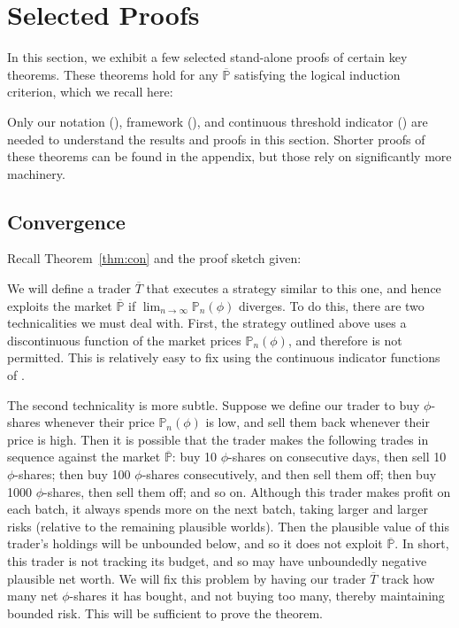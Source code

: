 \documentclass[authordate,onecolumn,noenvironments]{miri-tech-article}
\numberwithin{equation}{subsection}
\newcommand{\seq}[1]{{\overline{#1}}}
\newcommand{\nn}{n}
\newcommand{\lic}{logical induction criterion}
\newcommand{\trade}{T}%
\newcommand{\Trader}{\seq{\trade}} %
\newcommand{\BelState}{\mathbb{P}}
\newcommand{\pt}{\BelState}
\newcommand{\MP}{\seq{\pt}}
\begin{document}
%
%
%
%
%
%
%
%
%
%
%
%
%
%
%
%
%


\section{Selected Proofs}\label{sec:selectedproofs}

In this section, we exhibit a few selected stand-alone proofs of certain key theorems. These theorems hold for any $\MP$ satisfying the \lic{}, which we recall here:

\criterion*

\noindent Only our notation (), framework (), and continuous threshold indicator () are needed to understand the results and proofs in this section. Shorter proofs of these theorems can be found in the appendix, but those rely on significantly more machinery.


\subsection{Convergence}\label{sec:convergence}
Recall Theorem~\ref{thm:con} and the proof sketch given:

\convergence*

\sketchcon*

\noindent We will define a trader $\Trader$ that executes a strategy similar to this one, and hence exploits the market $\MP$ if $\lim_{\nn\to\infty} \pt_\nn(\phi)$ diverges. To do this, there are two technicalities we must deal with. First, the strategy outlined above uses a discontinuous function of the market prices $\pt_\nn(\phi)$, and therefore is not permitted. This is relatively easy to fix using the continuous indicator functions of .

The second technicality is more subtle. Suppose we define our trader to buy $\phi$-shares whenever their price $\pt_\nn(\phi)$ is low, and sell them back whenever their price is high.  Then  it is possible that the trader makes the following trades in sequence against the market $\MP$: buy 10 $\phi$-shares on consecutive days, then sell 10 $\phi$-shares; then buy 100 $\phi$-shares consecutively, and then sell them off; then buy 1000 $\phi$-shares, then sell them off; and so on. Although this trader makes profit on each batch, it always spends more on the next batch, taking larger and larger risks (relative to the remaining plausible worlds). Then the plausible value of this trader's holdings will be unbounded below, and so it does not exploit $\MP$. In short, this trader is not tracking its budget, and so may have unboundedly negative plausible net worth. We will fix this problem by having our trader $\Trader$ track how many net $\phi$-shares it has bought, and not buying too many, thereby maintaining bounded risk. This will be sufficient to prove the theorem.
\end{document}
